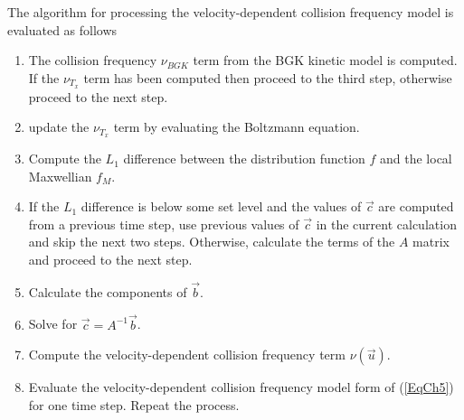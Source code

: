 The algorithm for processing the velocity-dependent collision frequency model is evaluated as follows
%
\begin{enumerate}
\item
The collision frequency $\nu_{BGK}$ term from the BGK kinetic model is computed. If the $\nu_{T_x}$ term has been computed then proceed to the third step, otherwise proceed to the next step.
%
\item
update the $\nu_{T_x}$ term by evaluating the Boltzmann equation.
%
\item
Compute the $L_1$ difference between the distribution function $f$ and the local Maxwellian $f_M$.
%
\item
If the $L_1$ difference is below some set level and the values of $\vec{c}$ are computed from a previous time step, use previous values of $\vec{c}$ in the current calculation and skip the next two steps. Otherwise, calculate the terms of the $A$ matrix and proceed to the next step.
%
\item
Calculate the components of $\vec{b}$.
%
\item
Solve for $\vec{c} = A^{-1} \vec{b}$.
%
\item
Compute the velocity-dependent collision frequency term $\nu(\vec{u})$.
%
\item
Evaluate the velocity-dependent collision frequency model form of (\ref{EqCh5}) for one time step. Repeat the process.
\end{enumerate}
%
%

